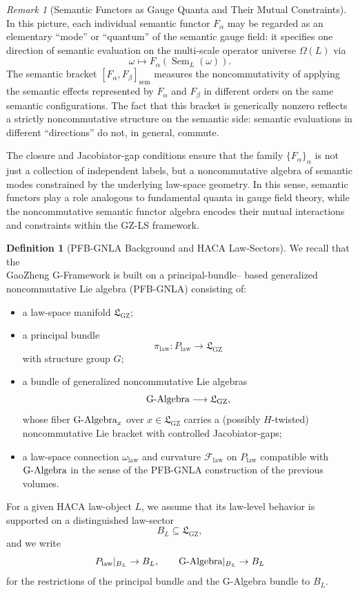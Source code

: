 \documentclass[11pt]{book}
\theoremstyle{plain}
\theoremstyle{definition}
\newtheorem{definition}[theorem]{Definition}
\theoremstyle{remark}
\newtheorem{remark}[theorem]{Remark}
\newcommand{\GZLS}{\ensuremath{\mathfrak{L}_{\mathrm{GZ}}}}       \newcommand{\GZLT}{\ensuremath{M_{!w}}}                           \newcommand{\GZLOC}{\ensuremath{A_M}}                             \newcommand{\GZLC}{\ensuremath{\omega_{\mathrm{law}}}}            \newcommand{\GZLCurv}{\ensuremath{\mathcal{F}_{\mathrm{law}}}}
\begin{document}
\begin{remark}[Semantic Functors as Gauge Quanta and Their Mutual Constraints]
\label{rem:semantic-functors-as-quanta}
In this picture, each individual semantic functor $F_\alpha$ may be
regarded as an elementary ``mode'' or ``quantum'' of the semantic gauge
field: it specifies one direction of semantic evaluation on the
multi-scale operator universe $\Omega(L)$ via
\[
  \omega \longmapsto F_\alpha(\operatorname{Sem}_L(\omega)).
\]
The semantic bracket
$[F_\alpha,F_\beta]_{\mathrm{sem}}$ measures the noncommutativity of
applying the semantic effects represented by $F_\alpha$ and $F_\beta$ in
different orders on the same semantic configurations. The fact that this
bracket is generically nonzero reflects a strictly noncommutative
structure on the semantic side: semantic evaluations in different
``directions'' do not, in general, commute.

The closure and Jacobiator-gap conditions ensure that the family
$\{F_\alpha\}_\alpha$ is not just a collection of independent labels,
but a noncommutative algebra of semantic modes constrained by the
underlying law-space geometry. In this sense, semantic functors play a
role analogous to fundamental quanta in gauge field theory, while the
noncommutative semantic functor algebra encodes their mutual
interactions and constraints within the GZ-LS framework.

\end{remark}

\begin{definition}[PFB-GNLA Background and HACA Law-Sectors]
\label{def:pfb-gnla-background-haca-sector}
We recall that the \\GaoZheng G-Framework is built on a principal-bundle–
based generalized noncommutative Lie algebra (PFB-GNLA) consisting of:
\begin{itemize}
  \item a law-space manifold $\GZLS$;
  \item a principal bundle
        \[
          \pi_{\mathrm{law}} : P_{\mathrm{law}}\longrightarrow \GZLS
        \]
        with structure group $G$;
  \item a bundle of generalized noncommutative Lie algebras
        \[
          \GAlgebra \longrightarrow \GZLS,
        \]
        whose fiber $\text{G-Algebra}_x$ over $x\in\GZLS$ carries a (possibly
        $H$-twisted) noncommutative Lie bracket with controlled
        Jacobiator-gaps;
  \item a law-space connection $\GZLC$ and curvature $\GZLCurv$ on
        $P_{\mathrm{law}}$ compatible with $\text{G-Algebra}$ in the sense of
        the PFB-GNLA construction of the previous volumes.
\end{itemize}

For a given HACA law-object $L$, we assume that its law-level behavior
is supported on a distinguished law-sector
\[
  B_L\subseteq \GZLS,
\]
and we write
\[
  P_{\mathrm{law}}|_{B_L}\to B_L,
  \qquad
  \text{G-Algebra}|_{B_L}\to B_L
\]
for the restrictions of the principal bundle and the G-Algebra bundle to
$B_L$.

\end{definition}
\end{document}
